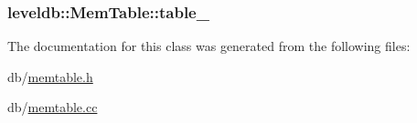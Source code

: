 \subsubsection[{table\+\_\+}]{ leveldb\+::\+Mem\+Table\+::table\+\_\+\hspace{0.3cm}{\ttfamily [private]}}\label{classleveldb_1_1_mem_table_a9337befab75dc6796fe652a5714db255}


The documentation for this class was generated from the following files\+:\begin{DoxyCompactItemize}
\item 
db/\hyperlink{memtable_8h}{memtable.\+h}\item 
db/\hyperlink{memtable_8cc}{memtable.\+cc}\end{DoxyCompactItemize}
